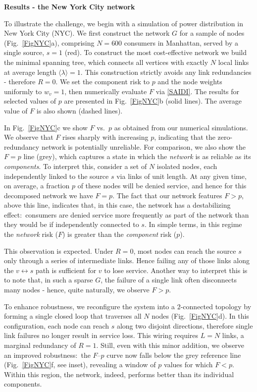 \documentclass[oneside, a4paper, onecolumn, 11pt]{article}
\newcommand{\av}[1]{\langle #1 \rangle}
\begin{document}
\begin{refsection}
\vspace{3mm}
\textbf{\color{blue} \Large Results - the New York City network}

To illustrate the challenge, we begin with a simulation of power distribution in New York City (NYC). We first construct the network $G$ for a sample of nodes (Fig.\ \ref{FigNYC}a), comprising $N = 600$ consumers in Manhattan, served by a single source, $s = 1$ (red). To construct the most cost-effective network we build the minimal spanning tree, which connects all vertices with exactly $N$ local links at average length $\av \lambda = 1$. This construction strictly avoids any link redundancies - therefore $R = 0$. We set the component risk to $p$ and the node weights uniformly to $w_v = 1$, then numerically evaluate $F$ via \eqref{SAIDI}. The results for selected values of $p$ are presented in Fig.\ \ref{FigNYC}b (solid lines). The average value of $F$ is also shown (dashed lines). 

In Fig.\ \ref{FigNYC}c we show $F$ vs.\ $p$ as obtained from our numerical simulations. We observe that $F$ rises sharply with increasing $p$, indicating that the zero-redundancy network is potentially unreliable. For comparison, we also show the $F = p$ line (grey), which captures a state in which the \textit{network} is as reliable as its \textit{components}. To interpret this, consider a set of $N$ isolated nodes, each independently linked to the source $s$ via links of unit length. At any given time, on average, a fraction $p$ of these nodes will be denied service, and hence for this decomposed network we have $F = p$. The fact that our network features $F > p$, above this line, indicates that, in this case, the network has a destabilizing effect:\ consumers are denied service more frequently as part of the network than they would be if independently connected to $s$. In simple terms, in this regime the \textit{network} risk ($F$) is greater than the \textit{component} risk ($p$). 

This observation is expected. Under $R = 0$, most nodes can reach the source $s$ only through a series of intermediate links. Hence failing any of those links along the $v \leftrightarrow s$ path is sufficient for $v$ to lose service. Another way to interpret this is to note that, in such a sparse $G$, the failure of a single link often disconnects many nodes - hence, quite naturally, we observe $F > p$.

To enhance robustness, we reconfigure the system into a $2$-connected topology by forming a single closed loop that traverses all $N$ nodes (Fig.\ \ref{FigNYC}d). In this configuration, each node can reach $s$ along two disjoint directions, therefore single link failures no longer result in service loss. This wiring requires $L = N$ links, a marginal redundancy of $R = 1$. Still, even with this minor addition, we observe an improved robustness:\ the $F$–$p$ curve now falls below the grey reference line (Fig.\ \ref{FigNYC}f, see inset), revealing a window of $p$ values for which $F < p$. Within this region, the network, indeed, performs better than its individual components.


\end{refsection}
\end{document}
